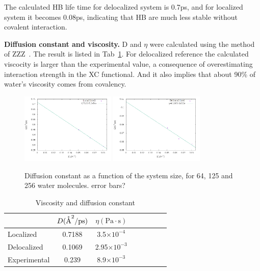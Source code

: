 \documentclass[prl,twocolumn,showpacs]{revtex4}
\begin{document}
The calculated HB life time for delocalized system is 0.7ps, and for localized system it becomes 0.08ps, indicating that HB are much less stable without covalent interaction. 
 
 
\textbf{Diffusion constant and viscosity.} D and $\eta$ were calculated using the method of ZZZ~\cite{ZZZ}. The result is listed in Tab~\ref{Tab:dfs}. For delocalized reference the calculated viscocity is larger than the experimental value, a consequence of overestimating interaction strength in the XC functional. And it also implies that about 90\% of water's viscosity comes from covalency.

\begin{figure}
\includegraphics[width=0.4\textwidth]{ALMO_0_msd}
\includegraphics[width=0.4\textwidth]{FULL_SCF_msd}
\caption{Diffusion constant as a function of the system size, for 64, 125 and 256 water molecules. \new error bars?\old }\label{Fig:dfs}
\end{figure} 

\begin{table}
\caption{Viscosity and diffusion constant}\label{Tab:dfs}
\begin{tabular}{l*{6}{c}r}
\hline
               & $D(\mathring{\text{A}}^2/\text{ps})$ & $\eta(\text{Pa}\cdot \text{s})$ \\
\hline
Localized                & 0.7188 & 3.5$\times 10^{-4}$ \\

Delocalized              & 0.1069 & 2.95$\times 10^{-3}$\\

Experimental            & 0.239  & 8.9$\times 10^{-3} $


\end{tabular}

\end{table}
 
\end{document}
